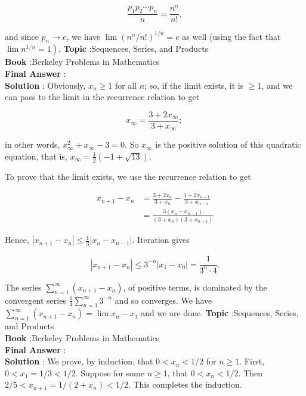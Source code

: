 \documentclass[10pt]{article}
\begin{document}
$$
\frac{p_{1} p_{2} \cdots p_{n}}{n}=\frac{n^{n}}{n !},
$$

and since $p_{n} \rightarrow e$, we have $\lim \left(n^{n} / n !\right)^{1 / n}=e$ as well (using the fact that $\left.\lim n^{1 / n}=1\right)$.
\textbf{Topic} :Sequences, Series, and Products \\
\textbf{Book} :Berkeley Problems in Mathematics\\
\textbf{Final Answer} :\\


\textbf{Solution} : Obviously, $x_{n} \geqslant 1$ for all $n$; so, if the limit exists, it is $\geqslant 1$, and we can pass to the limit in the recurrence relation to get

$$
x_{\infty}=\frac{3+2 x_{\infty}}{3+x_{\infty}} \text {; }
$$

in other words, $x_{\infty}^{2}+x_{\infty}-3=0$. So $x_{\infty}$ is the positive solution of this quadratic equation, that is, $x_{\infty}=\frac{1}{2}(-1+\sqrt{13})$.

To prove that the limit exists, we use the recurrence relation to get

$$
\begin{aligned}
x_{n+1}-x_{n} &=\frac{3+2 x_{n}}{3+x_{n}}-\frac{3+2 x_{n-1}}{3+x_{n-1}} \\
&=\frac{3\left(x_{n}-x_{n-1}\right)}{\left(3+x_{n}\right)\left(3+x_{n+1}\right)}
\end{aligned}
$$

Hence, $\left|x_{n+1}-x_{n}\right| \leqslant \frac{1}{3}\left|x_{n}-x_{n-1}\right|$. Iteration gives

$$
\left|x_{n+1}-x_{n}\right| \leqslant 3^{-n}\left|x_{1}-x_{0}\right|=\frac{1}{3^{n} \cdot 4} .
$$

The series $\sum_{n=1}^{\infty}\left(x_{n+1}-x_{n}\right)$, of positive terms, is dominated by the convergent series $\frac{1}{4} \sum_{n=1}^{\infty} 3^{-n}$ and so converges. We have $\sum_{n=1}^{\infty}\left(x_{n+1}-x_{n}\right)=\lim x_{n}-x_{1}$ and we are done.
\textbf{Topic} :Sequences, Series, and Products \\
\textbf{Book} :Berkeley Problems in Mathematics\\
\textbf{Final Answer} :\\


\textbf{Solution} : We prove, by induction, that $0<x_{n}<1 / 2$ for $n \geqslant 1$. First, $0<x_{1}=1 / 3<1 / 2$. Suppose for some $n \geqslant 1$, that $0<x_{n}<1 / 2$. Then $2 / 5<x_{n+1}=1 /\left(2+x_{n}\right)<1 / 2$. This completes the induction.
\end{document}
